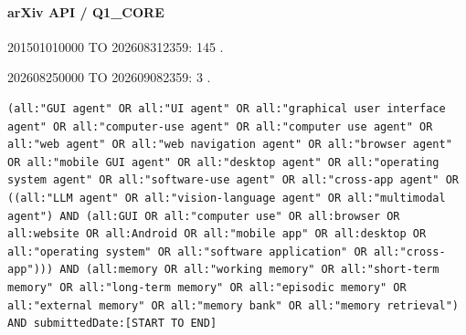 \noindent\begin{minipage}{\linewidth}
\paragraph{arXiv API / Q1\_CORE}
\par 201501010000 TO 202608312359: 145 .
\par 202608250000 TO 202609082359: 3 .
\begin{lstlisting}
(all:"GUI agent" OR all:"UI agent" OR all:"graphical user interface agent" OR all:"computer-use agent" OR all:"computer use agent" OR all:"web agent" OR all:"web navigation agent" OR all:"browser agent" OR all:"mobile GUI agent" OR all:"desktop agent" OR all:"operating system agent" OR all:"software-use agent" OR all:"cross-app agent" OR ((all:"LLM agent" OR all:"vision-language agent" OR all:"multimodal agent") AND (all:GUI OR all:"computer use" OR all:browser OR all:website OR all:Android OR all:"mobile app" OR all:desktop OR all:"operating system" OR all:"software application" OR all:"cross-app"))) AND (all:memory OR all:"working memory" OR all:"short-term memory" OR all:"long-term memory" OR all:"episodic memory" OR all:"external memory" OR all:"memory bank" OR all:"memory retrieval") AND submittedDate:[START TO END]
\end{lstlisting}
\end{minipage}\par\medskip
